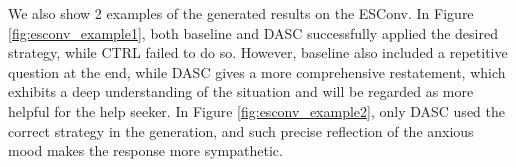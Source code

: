 We also show 2 examples of the generated results on the ESConv. In Figure \ref{fig:esconv_example1}, both baseline and DASC successfully applied the desired strategy, while CTRL failed to do so. However, baseline also included a repetitive question at the end, while DASC gives a more comprehensive restatement, which exhibits a deep understanding of the situation and will be regarded as more helpful for the help seeker. In Figure \ref{fig:esconv_example2}, only DASC used the correct strategy in the generation, and such precise reflection of the anxious mood makes the response more sympathetic.
